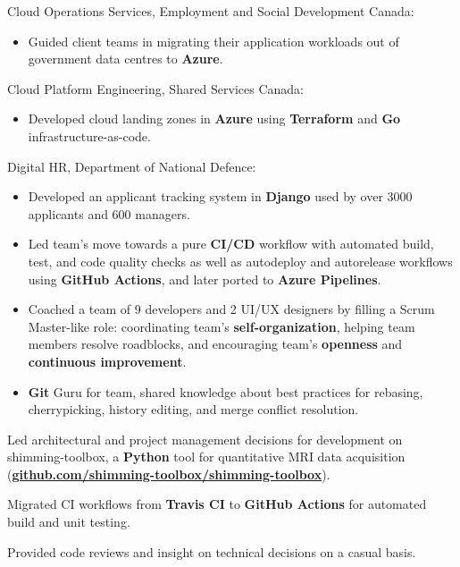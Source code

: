 \documentclass[]{jidicula-resume}
\begin{document}
\vspace{\topsep} %
\begin{tightemize}
\item Cloud Operations Services, Employment and Social Development Canada:
  \begin{itemize}
  \item Guided client teams in migrating their application workloads out of government data centres to \textbf{Azure}.
  \end{itemize}
\item Cloud Platform Engineering, Shared Services Canada:
  \begin{itemize}
  \item Developed cloud landing zones in \textbf{Azure} using \textbf{Terraform} and \textbf{Go} infrastructure-as-code.
  \end{itemize}
\item Digital HR, Department of National Defence:
  \begin{itemize}
  \item Developed an applicant tracking system in \textbf{Django} used by over 3000 applicants and 600 managers.
  \item Led team's move towards a pure \textbf{CI/CD} workflow with automated build, test, and code quality checks as well as autodeploy and autorelease workflows using \textbf{GitHub Actions}, and later ported to \textbf{Azure Pipelines}.
  \item Coached a team of 9 developers and 2 UI/UX designers by filling a Scrum Master-like role: coordinating team's \textbf{self-organization}, helping team members resolve roadblocks, and encouraging team's \textbf{openness} and \textbf{continuous improvement}.
  \item \textbf{Git} Guru for team, shared knowledge about best practices for rebasing, cherrypicking, history editing, and merge conflict resolution.
  \end{itemize}
\end{tightemize}
\sectionsep{}

\vspace{\topsep} %
\begin{tightemize}
\item Led architectural and project management decisions for development on shimming-toolbox, a \textbf{Python} tool for quantitative MRI data acquisition (\href{https://github.com/shimming-toolbox/shimming-toolbox}{\bf github.com/shimming-toolbox/shimming-toolbox}).
\item Migrated CI workflows from \textbf{Travis CI} to \textbf{GitHub Actions} for automated build and unit testing.
\item Provided code reviews and insight on technical decisions on a casual basis.
\end{tightemize}
\sectionsep{}
\end{document}
